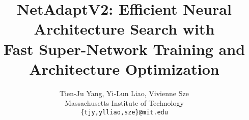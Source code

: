 \documentclass[final]{cvpr}
\begin{document}
\title{NetAdaptV2: Efficient Neural Architecture Search with \\ Fast Super-Network Training and Architecture Optimization\vspace{-1em}}

\author{Tien-Ju Yang, Yi-Lun Liao, Vivienne Sze\\
Massachusetts Institute of Technology\\
{\tt\small \{tjy,ylliao,sze\}@mit.edu}}

\maketitle



















\clearpage

\appendix



\clearpage
\clearpage
{


}
\end{document}
